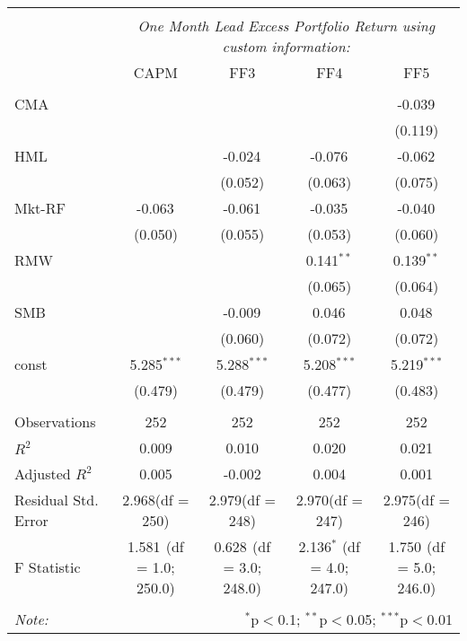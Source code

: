 \begin{table}[!htbp] \centering
\begin{tabular}{@{\extracolsep{5pt}}lcccc}
\\[-1.8ex]\hline
\hline \\[-1.8ex]
& \multicolumn{4}{c}{\textit{One Month Lead Excess Portfolio Return using custom information:}} \
\cr \cline{4-5}
\\[-1.8ex] & CAPM & FF3 & FF4 & FF5 \\
\hline \\[-1.8ex]
 CMA & & & & -0.039$^{}$ \\
  & & & & (0.119) \\
 HML & & -0.024$^{}$ & -0.076$^{}$ & -0.062$^{}$ \\
  & & (0.052) & (0.063) & (0.075) \\
 Mkt-RF & -0.063$^{}$ & -0.061$^{}$ & -0.035$^{}$ & -0.040$^{}$ \\
  & (0.050) & (0.055) & (0.053) & (0.060) \\
 RMW & & & 0.141$^{**}$ & 0.139$^{**}$ \\
  & & & (0.065) & (0.064) \\
 SMB & & -0.009$^{}$ & 0.046$^{}$ & 0.048$^{}$ \\
  & & (0.060) & (0.072) & (0.072) \\
 const & 5.285$^{***}$ & 5.288$^{***}$ & 5.208$^{***}$ & 5.219$^{***}$ \\
  & (0.479) & (0.479) & (0.477) & (0.483) \\
\hline \\[-1.8ex]
 Observations & 252 & 252 & 252 & 252 \\
 $R^2$ & 0.009 & 0.010 & 0.020 & 0.021 \\
 Adjusted $R^2$ & 0.005 & -0.002 & 0.004 & 0.001 \\
 Residual Std. Error & 2.968(df = 250) & 2.979(df = 248) & 2.970(df = 247) & 2.975(df = 246)  \\
 F Statistic & 1.581$^{}$ (df = 1.0; 250.0) & 0.628$^{}$ (df = 3.0; 248.0) & 2.136$^{*}$ (df = 4.0; 247.0) & 1.750$^{}$ (df = 5.0; 246.0) \\
\hline
\hline \\[-1.8ex]
\textit{Note:} & \multicolumn{4}{r}{$^{*}$p$<$0.1; $^{**}$p$<$0.05; $^{***}$p$<$0.01} \\
\end{tabular}
\end{table}

